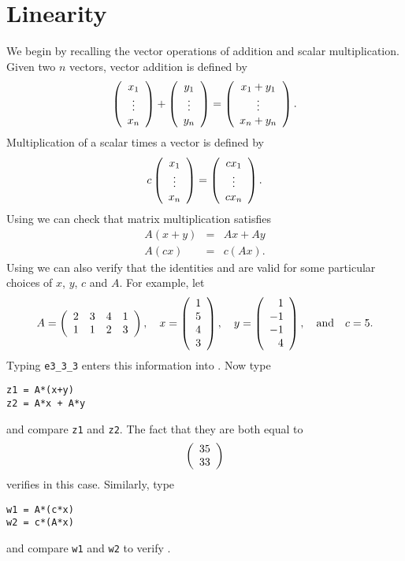 \section{Linearity}  \label{S:linearity}

We begin by recalling the vector operations of addition and
scalar multiplication.  Given two $n$ vectors, vector addition
 is defined by
\[
\left(\begin{array}{c} x_1 \\ \vdots \\ x_{n}\end{array}\right)+\left(\begin{array}{c} y_1 \\ \vdots \\ y_{n}\end{array}\right)=\left(\begin{array}{c} x_1+y_1 \\ \vdots \\
x_n+y_n\end{array}\right).
\]
Multiplication of a scalar  times a vector
is defined by
\[
c\left(\begin{array}{c} x_1 \\ \vdots \\ x_{n}\end{array}\right) = \left(\begin{array}{c} cx_1 \\ \vdots \\ cx_{n}\end{array}\right).
\]
Using  we can check that matrix multiplication
satisfies
\begin{eqnarray}
A(x+y) & = & Ax + Ay \label{sum} \\
A(cx) & = & c(Ax). \label{product}
\end{eqnarray}
Using \Matlab we can also verify that the identities 
and  are valid for some particular choices of $x$,
$y$, $c$ and $A$.  For example, let
\begin{equation*}
A = \left(\begin{array}{cccc} 2 & 3 & 4 & 1\\ 1 & 1 & 2 & 3
\end{array}\right), \quad x = \left(\begin{array}{r} 1 \\ 5 \\ 4 \\
3 \end{array}\right), \quad y = \left(\begin{array}{r} 1 \\ -1 \\ -1 \\
4 \end{array}\right), \quad\mbox{and}\quad c=5.
\end{equation*}
Typing {\tt e3\_3\_3} enters this information into \Matlabp.  Now
type
\begin{verbatim}
z1 = A*(x+y)
z2 = A*x + A*y
\end{verbatim}
and compare {\tt z1} and {\tt z2}.  The fact that they are both
equal to
\[
\left(\begin{array}{r} 35 \\ 33\end{array}\right)
\]
verifies  in this case.  Similarly, type
\begin{verbatim}
w1 = A*(c*x)
w2 = c*(A*x)
\end{verbatim}
and compare {\tt w1} and {\tt w2} to verify .


